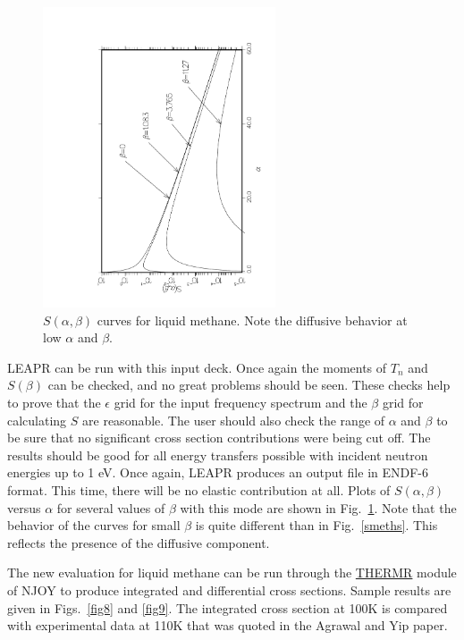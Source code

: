 \begin{figure}[b]\centering
\includegraphics[keepaspectratio, height=3.5in, angle=270]{figs/le7ack}
\caption[$S(\alpha,\beta)$ for Liquid Methane]{$S(\alpha,\beta)$ curves
 for liquid methane.  Note the diffusive behavior at low $\alpha$ and $\beta$.}
\label{fig7}
\end{figure}

LEAPR can be run with this input deck.  Once again the moments of $T_n$
and $S(\beta)$ can be checked, and no great problems should be seen.  These
checks help to prove that the $\epsilon$ grid for the input frequency
spectrum and the $\beta$ grid for calculating $S$ are reasonable.  The
user should also check the range of $\alpha$ and $\beta$ to be sure that no
significant cross section contributions were being cut off. The results
should be good for all energy transfers possible with incident neutron
energies up to 1 eV. Once again, LEAPR produces an output file in
ENDF-6 format.  This time, there will be no elastic contribution at all.
Plots of $S(\alpha,\beta)$ versus $\alpha$ for several values of $\beta$
with this mode are shown in Fig.~\ref{fig7}.  Note that the behavior of
the curves for small  $\beta$ is quite different than in
Fig.~\ref{smeths}.  This reflects the presence of the diffusive component.

The new evaluation for liquid methane can be run through the
\hyperlink{sTHERMRhy}{THERMR} module
of NJOY to produce integrated and differential cross sections.  Sample
results are given in Figs.~\ref{fig8} and \ref{fig9}.  The integrated
cross section at 100K is compared with experimental data at 110K that was
quoted in the Agrawal and Yip paper.

